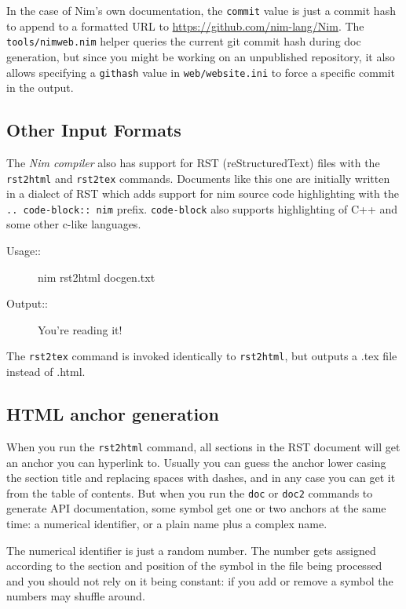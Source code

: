 In the case of Nim's own documentation, the \texttt{commit} value is
just a commit hash to append to a formatted URL to
\url{https://github.com/nim-lang/Nim}. The \texttt{tools/nimweb.nim}
helper queries the current git commit hash during doc generation, but
since you might be working on an unpublished repository, it also allows
specifying a \texttt{githash} value in \texttt{web/website.ini} to force
a specific commit in the output.

\hypertarget{other-input-formats}{%
\subsection{Other Input Formats}\label{other-input-formats}}

The \emph{Nim compiler} also has support for RST (reStructuredText)
files with the \texttt{rst2html} and \texttt{rst2tex} commands.
Documents like this one are initially written in a dialect of RST which
adds support for nim source code highlighting with the
\texttt{..\ code-block::\ nim} prefix. \texttt{code-block} also supports
highlighting of C++ and some other c-like languages.

\begin{description}
\item[Usage::]
nim rst2html docgen.txt
\item[Output::]
You're reading it!
\end{description}

The \texttt{rst2tex} command is invoked identically to
\texttt{rst2html}, but outputs a .tex file instead of .html.

\hypertarget{html-anchor-generation}{%
\subsection{HTML anchor generation}\label{html-anchor-generation}}

When you run the \texttt{rst2html} command, all sections in the RST
document will get an anchor you can hyperlink to. Usually you can guess
the anchor lower casing the section title and replacing spaces with
dashes, and in any case you can get it from the table of contents. But
when you run the \texttt{doc} or \texttt{doc2} commands to generate API
documentation, some symbol get one or two anchors at the same time: a
numerical identifier, or a plain name plus a complex name.

The numerical identifier is just a random number. The number gets
assigned according to the section and position of the symbol in the file
being processed and you should not rely on it being constant: if you add
or remove a symbol the numbers may shuffle around.

